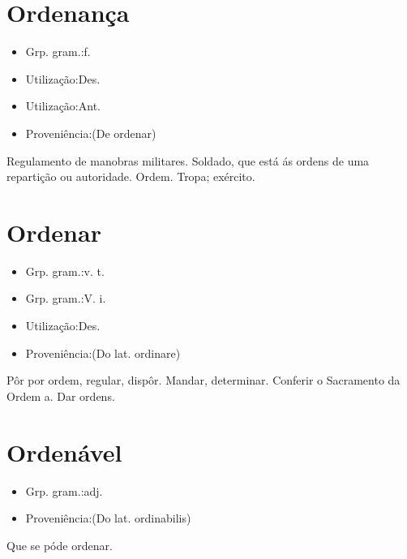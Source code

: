 \section{Ordenança}
\begin{itemize}
\item {Grp. gram.:f.}
\end{itemize}
\begin{itemize}
\item {Utilização:Des.}
\end{itemize}
\begin{itemize}
\item {Utilização:Ant.}
\end{itemize}
\begin{itemize}
\item {Proveniência:(De \textunderscore ordenar\textunderscore )}
\end{itemize}
Regulamento de manobras militares.
Soldado, que está ás ordens de uma repartição ou autoridade.
Ordem.
Tropa; exército.
\section{Ordenar}
\begin{itemize}
\item {Grp. gram.:v. t.}
\end{itemize}
\begin{itemize}
\item {Grp. gram.:V. i.}
\end{itemize}
\begin{itemize}
\item {Utilização:Des.}
\end{itemize}
\begin{itemize}
\item {Proveniência:(Do lat. \textunderscore ordinare\textunderscore )}
\end{itemize}
Pôr por ordem, regular, dispôr.
Mandar, determinar.
Conferir o Sacramento da Ordem a.
Dar ordens.
\section{Ordenável}
\begin{itemize}
\item {Grp. gram.:adj.}
\end{itemize}
\begin{itemize}
\item {Proveniência:(Do lat. \textunderscore ordinabilis\textunderscore )}
\end{itemize}
Que se póde ordenar.
